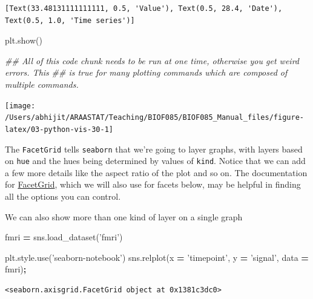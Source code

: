 \documentclass[
  letterpaper,
]{scrbook}
\newenvironment{Shaded}{\begin{snugshade}}{\end{snugshade}}
\newcommand{\CommentTok}[1]{\textcolor[rgb]{0.56,0.35,0.01}{\textit{#1}}}
\newcommand{\NormalTok}[1]{#1}
\newcommand{\OperatorTok}[1]{\textcolor[rgb]{0.81,0.36,0.00}{\textbf{#1}}}
\newcommand{\StringTok}[1]{\textcolor[rgb]{0.31,0.60,0.02}{#1}}
\begin{document}
\begin{verbatim}
[Text(33.48131111111111, 0.5, 'Value'), Text(0.5, 28.4, 'Date'), Text(0.5, 1.0, 'Time series')]
\end{verbatim}

\begin{Shaded}
\begin{Highlighting}[]
\NormalTok{plt.show()}

\CommentTok{## All of this code chunk needs to be run at one time, otherwise you get weird errors. This}
\CommentTok{## is true for many plotting commands which are composed of multiple commands. }
\end{Highlighting}
\end{Shaded}

\begin{center}\texttt{[image: /Users/abhijit/ARAASTAT/Teaching/BIOF085/BIOF085\_Manual\_files/figure-latex/03-python-vis-30-1]} \end{center}

The \texttt{FacetGrid} tells \texttt{seaborn} that we're going to layer graphs, with layers based on \texttt{hue} and the hues being determined by values of \texttt{kind}. Notice that we can add a few more details like the aspect ratio of the plot and so on. The documentation for \href{https://seaborn.pydata.org/generated/seaborn.FacetGrid.html}{FacetGrid}, which we will also use for facets below, may be helpful in finding all the options you can control.

We can also show more than one kind of layer on a single graph

\begin{Shaded}
\begin{Highlighting}[]
\NormalTok{fmri }\OperatorTok{=}\NormalTok{ sns.load_dataset(}\StringTok{'fmri'}\NormalTok{)}
\end{Highlighting}
\end{Shaded}

\begin{Shaded}
\begin{Highlighting}[]
\NormalTok{plt.style.use(}\StringTok{'seaborn-notebook'}\NormalTok{)}
\NormalTok{sns.relplot(x }\OperatorTok{=} \StringTok{'timepoint'}\NormalTok{, y }\OperatorTok{=} \StringTok{'signal'}\NormalTok{, data }\OperatorTok{=}\NormalTok{ fmri)}\OperatorTok{;}
\end{Highlighting}
\end{Shaded}

\begin{verbatim}
<seaborn.axisgrid.FacetGrid object at 0x1381c3dc0>
\end{verbatim}
\end{document}
